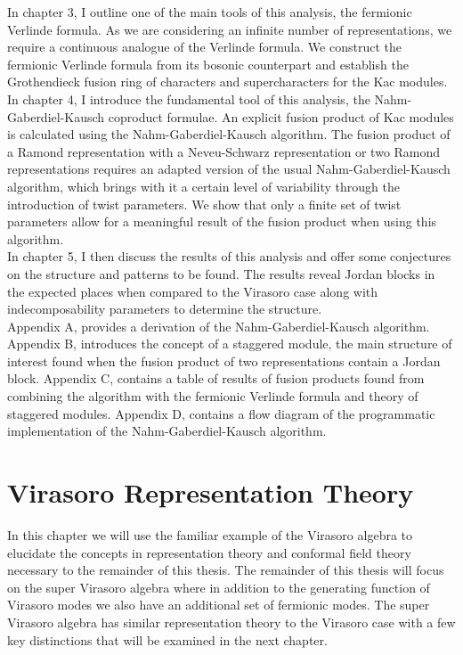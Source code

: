 \documentclass[a4paper,reqno,12pt]{report}
\theoremstyle{definition}
\numberwithin{equation}{section}
\newcommand{\ns}{Neveu-Schwarz}
\newcommand{\ram}{Ramond}
\theoremstyle{plain}
\begin{document}
In chapter 3, I outline one of the main tools of this analysis, the fermionic Verlinde formula. As we are considering an infinite number of representations, we require a continuous analogue of the Verlinde formula. We construct the fermionic Verlinde formula from its bosonic counterpart and establish the Grothendieck fusion ring of characters and supercharacters for the Kac modules.\\

In chapter 4, I introduce the fundamental tool of this analysis, the Nahm-Gaberdiel-Kausch coproduct formulae. An explicit fusion product of Kac modules is calculated using the Nahm-Gaberdiel-Kausch algorithm. The fusion product of a \ram{} representation with a \ns{} representation or two \ram{} representations requires an adapted version of the usual Nahm-Gaberdiel-Kausch algorithm, which brings with it a certain level of variability through the introduction of twist parameters. We show that only a finite set of twist parameters allow for a meaningful result of the fusion product when using this algorithm.\\

In chapter 5, I then discuss the results of this analysis and offer some conjectures on the structure and patterns to be found. The results reveal Jordan blocks in the expected places when compared to the Virasoro case along with indecomposability parameters to determine the structure.\\

Appendix A, provides a derivation of the Nahm-Gaberdiel-Kausch algorithm. Appendix B, introduces the concept of a staggered module, the main structure of interest found when the fusion product of two representations contain a Jordan block. Appendix C, contains a table of results of fusion products found from combining the algorithm with the fermionic Verlinde formula and theory of staggered modules. Appendix D, contains a flow diagram of the programmatic implementation of the Nahm-Gaberdiel-Kausch algorithm.


\chapter{Virasoro Representation Theory}

In this chapter we will use the familiar example of the Virasoro algebra to elucidate the concepts in representation theory and conformal field theory necessary to the remainder of this thesis. The remainder of this thesis will focus on the super Virasoro algebra where in addition to the generating function of Virasoro modes we also have an additional set of fermionic modes. The super Virasoro algebra has similar representation theory to the Virasoro case with a few key distinctions that will be examined in the next chapter. 
\end{document}
